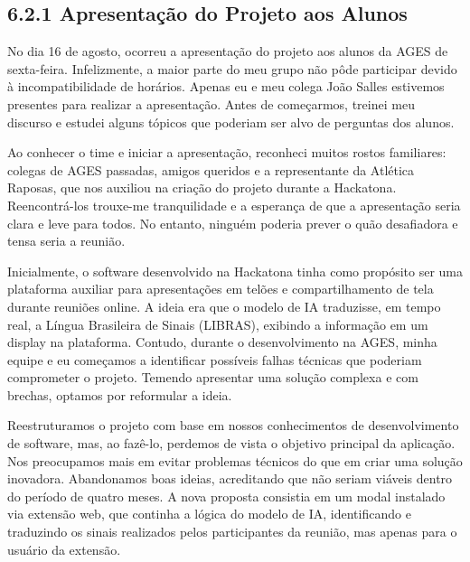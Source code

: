 \hypertarget{__RefHeading___Toc4468_3118176633}{}

\subsection*{6.2.1 Apresentação do Projeto aos Alunos}
\label{cliente-hoortech:text-h-0026}

\originaltab{}No dia 16 de agosto, ocorreu a apresentação do projeto aos alunos da AGES de sexta-feira. Infelizmente, a maior parte do meu grupo não pôde participar devido à incompatibilidade de horários. Apenas eu e meu colega João Salles estivemos presentes para realizar a apresentação. Antes de começarmos, treinei meu discurso e estudei alguns tópicos que poderiam ser alvo de perguntas dos alunos.\par

\originaltab{}Ao conhecer o time e iniciar a apresentação, reconheci muitos rostos familiares: colegas de AGES passadas, amigos queridos e a representante da Atlética Raposas, que nos auxiliou na criação do projeto durante a Hackatona. Reencontrá-los trouxe-me tranquilidade e a esperança de que a apresentação seria clara e leve para todos. No entanto, ninguém poderia prever o quão desafiadora e tensa seria a reunião.\par

\originaltab{}Inicialmente, o software desenvolvido na Hackatona tinha como propósito ser uma plataforma auxiliar para apresentações em telões e compartilhamento de tela durante reuniões online. A ideia era que o modelo de IA traduzisse, em tempo real, a Língua Brasileira de Sinais (LIBRAS), exibindo a informação em um display na plataforma. Contudo, durante o desenvolvimento na AGES, minha equipe e eu começamos a identificar possíveis falhas técnicas que poderiam comprometer o projeto. Temendo apresentar uma solução complexa e com brechas, optamos por reformular a ideia.\par

\originaltab{}Reestruturamos o projeto com base em nossos conhecimentos de desenvolvimento de software, mas, ao fazê-lo, perdemos de vista o objetivo principal da aplicação. Nos preocupamos mais em evitar problemas técnicos do que em criar uma solução inovadora. Abandonamos boas ideias, acreditando que não seriam viáveis dentro do período de quatro meses. A nova proposta consistia em um modal instalado via extensão web, que continha a lógica do modelo de IA, identificando e traduzindo os sinais realizados pelos participantes da reunião, mas apenas para o usuário da extensão.\par

